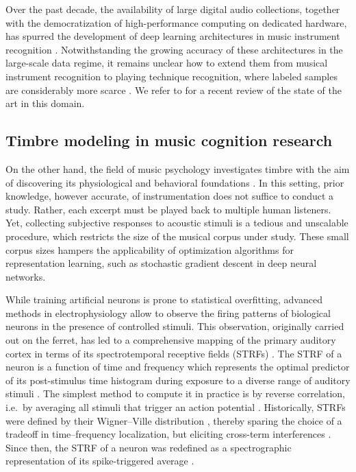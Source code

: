 \documentclass{bmcart}
\begin{document}
Over the past decade, the availability of large digital audio collections, together with the democratization of high-performance computing on dedicated hardware, has spurred the development of deep learning architectures in music instrument recognition \cite{mcfee2015ismir,pons2017eusipco,gururani2018ismir}.
Notwithstanding the growing accuracy of these architectures in the large-scale data regime, it remains unclear how to extend them from musical instrument recognition to playing technique recognition, where labeled samples are considerably more scarce \cite{loureiro2004ismir}.
We refer to \cite{han2017taslp} for a recent review of the state of the art in this domain.

\subsection*{Timbre modeling in music cognition research}
On the other hand, the field of music psychology investigates timbre with the aim of discovering its physiological and behavioral foundations \cite{mcadams2009chapter}.
In this setting, prior knowledge, however accurate, of instrumentation does not suffice to conduct a study.
Rather, each excerpt must be played back to multiple human listeners.
Yet, collecting subjective responses to acoustic stimuli is a tedious and unscalable procedure, which restricts the size of the musical corpus under study.
These small corpus sizes hampers the applicability of optimization algorithms for representation learning, such as stochastic gradient descent in deep neural networks.

While training artificial neurons is prone to statistical overfitting, advanced methods in electrophysiology allow to observe the firing patterns of biological neurons in the presence of controlled stimuli.
This observation, originally carried out on the ferret, has led to a comprehensive mapping of the primary auditory cortex in terms of its spectrotemporal receptive fields (STRFs) \cite{depireux2001jneur}.
The STRF of a neuron is a function of time and frequency which represents the optimal predictor of its post-stimulus time histogram during exposure to a diverse range of auditory stimuli \cite{aertsen1981biolcyb}.
The simplest method to compute it in practice is by reverse correlation, i.e.\ by averaging all stimuli that trigger an action potential \cite{deboer1968biomed}.
Historically, STRFs were defined by their Wigner--Ville distribution \cite{flandrin1998book}, thereby sparing the choice of a tradeoff in time--frequency localization, but eliciting cross-term interferences \cite{eggermont1993hearing}.
Since then, the STRF of a neuron was redefined as a spectrographic representation of its spike-triggered average \cite{klein2000compneur}.
\end{document}
